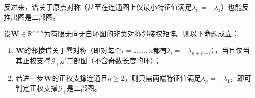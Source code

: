 反过来，谱关于原点对称（甚至在连通图上仅最小特征值满足$\lambda_n=-\lambda_1$）也能反推出图是二部图。

\begin{theorem}[二部图的谱对称性]
\label{thm:adjacency-bipartite-spectral-symmetry}
设$\bm W\in\mathbb R^{n\times n}$为有限无向无自环图的非负对称邻接权矩阵。则以下命题成立：
\begin{enumerate}
\item $\bm W$的邻接谱关于零对称（即对每个$i=1,\ldots,n$都有$\lambda_i=-\lambda_{n+1-i}$），当且仅当其正权支撑$\mathcal G_+$是二部图（不含奇数长度的环）；
\item 若进一步$\bm W$的正权支撑连通且$n\geq 2$，则只需两端特征值满足$\lambda_n=-\lambda_1$，即可判定正权支撑$\mathcal G_+$是二部图。
\end{enumerate}
\end{theorem}

